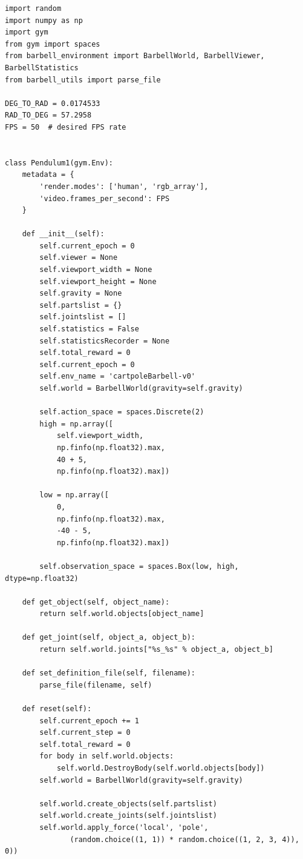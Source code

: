\documentclass[cic,tc]{iiufrgs}
\newenvironment{longlisting}{\captionsetup{type=listing}}{}
\begin{document}
\begin{longlisting}
\begin{verbatim}
import random
import numpy as np
import gym
from gym import spaces
from barbell_environment import BarbellWorld, BarbellViewer, BarbellStatistics
from barbell_utils import parse_file

DEG_TO_RAD = 0.0174533
RAD_TO_DEG = 57.2958
FPS = 50  # desired FPS rate


class Pendulum1(gym.Env):
    metadata = {
        'render.modes': ['human', 'rgb_array'],
        'video.frames_per_second': FPS
    }

    def __init__(self):
        self.current_epoch = 0
        self.viewer = None
        self.viewport_width = None
        self.viewport_height = None
        self.gravity = None
        self.partslist = {}
        self.jointslist = []
        self.statistics = False
        self.statisticsRecorder = None
        self.total_reward = 0
        self.current_epoch = 0
        self.env_name = 'cartpoleBarbell-v0'
        self.world = BarbellWorld(gravity=self.gravity)

        self.action_space = spaces.Discrete(2)
        high = np.array([
            self.viewport_width,
            np.finfo(np.float32).max,
            40 + 5,
            np.finfo(np.float32).max])

        low = np.array([
            0,
            np.finfo(np.float32).max,
            -40 - 5,
            np.finfo(np.float32).max])

        self.observation_space = spaces.Box(low, high, dtype=np.float32)

    def get_object(self, object_name):
        return self.world.objects[object_name]

    def get_joint(self, object_a, object_b):
        return self.world.joints["%s_%s" % object_a, object_b]

    def set_definition_file(self, filename):
        parse_file(filename, self)

    def reset(self):
        self.current_epoch += 1
        self.current_step = 0
        self.total_reward = 0
        for body in self.world.objects:
            self.world.DestroyBody(self.world.objects[body])
        self.world = BarbellWorld(gravity=self.gravity)

        self.world.create_objects(self.partslist)
        self.world.create_joints(self.jointslist)
        self.world.apply_force('local', 'pole',
               (random.choice((1, 1)) * random.choice((1, 2, 3, 4)), 0))


\end{verbatim}
\end{longlisting}
\end{document}
